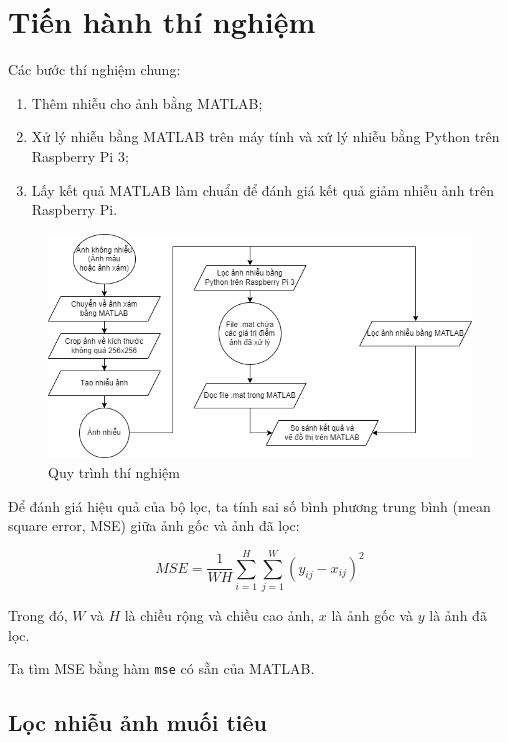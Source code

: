 \section{Tiến hành thí nghiệm}

Các bước thí nghiệm chung:

\begin{enumerate}
    \item Thêm nhiễu cho ảnh bằng MATLAB;
    \item Xử lý nhiễu bằng MATLAB trên máy tính và xứ lý nhiễu bằng Python trên Raspberry Pi 3;
    \item Lấy kết quả MATLAB làm chuẩn để đánh giá kết quả giảm nhiễu ảnh trên Raspberry Pi.
\end{enumerate}

\begin{figure}[H]
    \centering
    \includegraphics[width=\linewidth]{../images/denoise_flowchart.png}
    \caption{Quy trình thí nghiệm}
\end{figure}

Để đánh giá hiệu quả của bộ lọc, ta tính sai số bình phương trung bình (mean square error, MSE) giữa ảnh gốc và ảnh đã lọc:

\begin{equation}\label{eqn:MSE}
    MSE = \frac{1}{WH} \sum_{i=1}^{H} \sum_{j=1}^{W} {(y_{ij} - x_{ij})^2}
\end{equation}

Trong đó, $W$ và $H$ là chiều rộng và chiều cao ảnh, $x$ là ảnh gốc và $y$ là ảnh đã lọc.

Ta tìm MSE bằng hàm \verb|mse| có sẵn của MATLAB.

\subsection{Lọc nhiễu ảnh muối tiêu}

